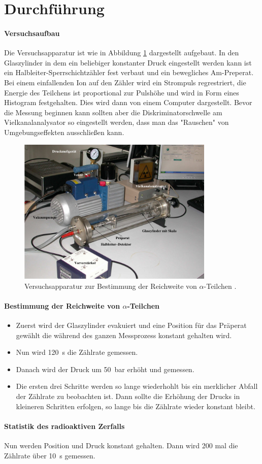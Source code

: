 \section{Durchführung}
\label{sec:Durchführung}
\paragraph{Versuchsaufbau}
Die Versuchsapparatur ist wie in Abbildung \ref{fig:VB} dargestellt aufgebaut.
In den Glaszylinder in dem ein beliebiger konstanter Druck eingestellt werden kann
ist ein Halbleiter-Sperrschichtzähler fest verbaut und ein bewegliches Am-Preperat.
Bei einem einfallenden Ion auf den Zähler wird ein Strompuls regrestriert,
die Energie des Teilchens ist proportional zur Pulshöhe und wird in Form eines
Histogram festgehalten. Dies wird dann von einem Computer dargestellt. Bevor
die Messung beginnen kann sollten aber die Diskriminatorschwelle am Vielkanalanalysator
so eingestellt werden, dass man das "Rauschen" von Umgebungseffekten ausschließen kann.

\begin{figure}
  \centering
  \includegraphics[height=7cm]{logos/Versuchsaufbau.png}
  \caption{Versuchsapparatur zur Bestimmung der Reichweite von \texorpdfstring{$\alpha$}{math}-Teilchen \cite{Anleitung}.}
  \label{fig:VB}
\end{figure}
\paragraph{Bestimmung der Reichweite von \texorpdfstring{$\alpha$}{math}-Teilchen}
\begin{itemize}
  \item Zuerst wird der Glaszylinder evakuiert und eine Position für das Präperat gewählt
  die während des ganzen Messprozess konstant gehalten wird.
  \item Nun wird \SI{120}{\second} die Zählrate gemessen.
  \item Danach wird der Druck um \SI{50}{\bar} erhöht und gemessen.
  \item Die ersten drei Schritte werden so lange wiederhohlt bis ein merklicher
  Abfall der Zählrate zu beobachten ist. Dann sollte die Erhöhung der Drucks in
  kleineren Schritten erfolgen, so lange bis die Zählrate wieder konstant bleibt.
\end{itemize}
\paragraph{Statistik des radioaktiven Zerfalls}
Nun werden Position und Druck konstant gehalten. Dann wird 200 mal die
Zählrate über \SI{10}{\second} gemessen.
